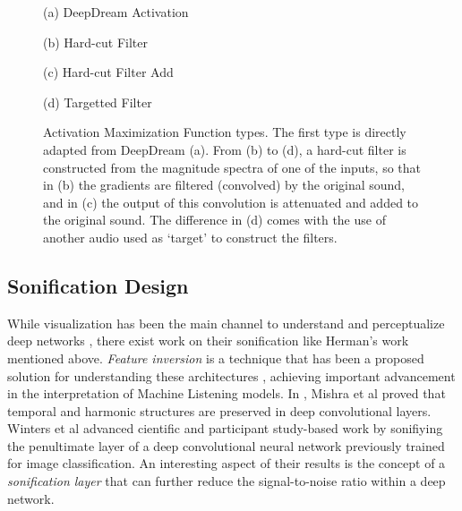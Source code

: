 \documentclass[a4paper,10pt,oneside]{article}
\begin{document}
\begin{sloppy}
\begin{figure}[h]
\begin{minipage}[h]{0.5\columnwidth}
  \centerline{}
  \centerline{(a) DeepDream Activation}\medskip
\end{minipage}
\begin{minipage}[h]{0.5\columnwidth}
  \centerline{}
  \centerline{(b) Hard-cut Filter}\medskip
\end{minipage}
\begin{minipage}[h]{0.5\columnwidth}
  \centerline{}
  \centerline{(c) Hard-cut Filter Add}\medskip
\end{minipage}
\begin{minipage}[h]{0.5\columnwidth}
  \centerline{}
  \centerline{(d) Targetted Filter }\medskip
\end{minipage}
\caption{Activation Maximization Function types. The first type is directly adapted from DeepDream (a). From (b) to (d), a hard-cut filter is constructed from the magnitude spectra of one of the inputs, so that in (b) the gradients are filtered (convolved) by the original sound, and in (c) the output of this convolution is attenuated and added to the original sound. The difference in (d) comes with the use of another audio used as `target' to construct the filters.}
\label{fig:maxfun}
\end{figure}
\subsection{Sonification Design}

While visualization has been the main channel to understand and perceptualize deep networks \cite{simonyan2014deep}, there exist work on their sonification like Herman's work mentioned above. \textit{Feature inversion} is a technique that has been a proposed solution for understanding these architectures \cite{mahendran2014understanding, dosovitskiy2016inverting}, achieving important advancement in the interpretation of Machine Listening models. In \cite{saumitra_mishra_2018_1492527}, Mishra et al proved that temporal and harmonic structures are preserved in deep convolutional layers. Winters et al \cite{Winters2019} advanced cientific and participant study-based work by sonifiying the penultimate layer of a deep convolutional neural network previously trained for image classification. An interesting aspect of their results is the concept of a \textit{sonification layer} that can further reduce the signal-to-noise ratio within a deep network. 


\end{sloppy}
\end{document}
